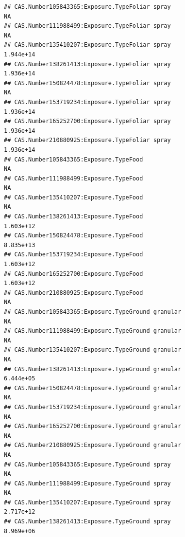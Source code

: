 \documentclass[
  12pt,
]{article}
\begin{document}
\begin{verbatim}
## CAS.Number105843365:Exposure.TypeFoliar spray                                           NA
## CAS.Number111988499:Exposure.TypeFoliar spray                                           NA
## CAS.Number135410207:Exposure.TypeFoliar spray                                    1.944e+14
## CAS.Number138261413:Exposure.TypeFoliar spray                                    1.936e+14
## CAS.Number150824478:Exposure.TypeFoliar spray                                           NA
## CAS.Number153719234:Exposure.TypeFoliar spray                                    1.936e+14
## CAS.Number165252700:Exposure.TypeFoliar spray                                    1.936e+14
## CAS.Number210880925:Exposure.TypeFoliar spray                                    1.936e+14
## CAS.Number105843365:Exposure.TypeFood                                                   NA
## CAS.Number111988499:Exposure.TypeFood                                                   NA
## CAS.Number135410207:Exposure.TypeFood                                                   NA
## CAS.Number138261413:Exposure.TypeFood                                            1.603e+12
## CAS.Number150824478:Exposure.TypeFood                                            8.835e+13
## CAS.Number153719234:Exposure.TypeFood                                            1.603e+12
## CAS.Number165252700:Exposure.TypeFood                                            1.603e+12
## CAS.Number210880925:Exposure.TypeFood                                                   NA
## CAS.Number105843365:Exposure.TypeGround granular                                        NA
## CAS.Number111988499:Exposure.TypeGround granular                                        NA
## CAS.Number135410207:Exposure.TypeGround granular                                        NA
## CAS.Number138261413:Exposure.TypeGround granular                                 6.444e+05
## CAS.Number150824478:Exposure.TypeGround granular                                        NA
## CAS.Number153719234:Exposure.TypeGround granular                                        NA
## CAS.Number165252700:Exposure.TypeGround granular                                        NA
## CAS.Number210880925:Exposure.TypeGround granular                                        NA
## CAS.Number105843365:Exposure.TypeGround spray                                           NA
## CAS.Number111988499:Exposure.TypeGround spray                                           NA
## CAS.Number135410207:Exposure.TypeGround spray                                    2.717e+12
## CAS.Number138261413:Exposure.TypeGround spray                                    8.969e+06

\end{verbatim}
\end{document}
